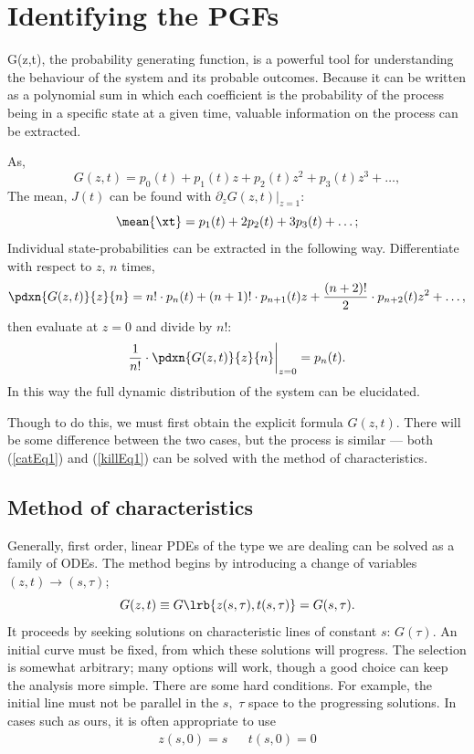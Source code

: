 \section{Identifying the PGFs}

G(z,t), the probability generating function, is a powerful tool for understanding the behaviour of the system and its probable outcomes. Because it can be written as a polynomial sum in which each coefficient is the probability of the process being in a specific state at a given time, valuable information on the process can be extracted. \par
As,
$$G(z,t) = p_0(t) + p_1(t)z + p_2(t)z^2 + p_3(t)z^3 + \dots,$$
The mean, $J(t)$ can be found with $\partial_zG(z,t)|_{z=1}$:
$$\mean{\xt} = p_1(t) + 2p_2(t) + 3p_3(t) + \dots;$$
Individual state-probabilities can be extracted in the following way. Differentiate with respect to $z$, $n$ times,
$$\pdxn{G(z,t)}{z}{n} =  n! \cdot p_n(t) + (n+1)! \cdot p_{n+1}(t) z + \frac{(n+2)!}{2} \cdot p_{n+2}(t) z^2 + \dots,$$
then evaluate at $z=0$ and divide by $n!$:
\begin{equation}
\label{stateFormula}
\frac{1}{n!}\cdot\pdxn{G(z,t)}{z}{n}\bigg|_{z=0} = p_n(t).
\end{equation}
In this way the full dynamic distribution of the system can be elucidated.

Though to do this, we must first obtain the explicit formula $G(z,t)$. There will be some difference between the two cases, but the process is similar --- both (\ref{catEq1}) and (\ref{killEq1}) can be solved with the method of characteristics. 


\subsection{Method of characteristics}

Generally, first order, linear PDEs of the type we are dealing can be solved as a family of ODEs. The method begins by introducing a change of variables $(z,t)\to(s,\tau)$;
$$G(z,t)\equiv G\lrb{z(s, \tau),t(s,\tau)} = G(s, \tau).$$
It proceeds by seeking solutions on characteristic lines of constant $s$: $G(\tau)$. An initial curve must be fixed, from which these solutions will progress. The selection is somewhat arbitrary; many options will work, though a good choice can keep the analysis more simple. There are some hard conditions. For example, the initial line must not be parallel in the $s,$ $\tau$ space to the progressing solutions. In cases such as ours, it is often appropriate to use
\begin{align}
\label{ICs}
z(s,0) = s&& t(s,0) = 0
\end{align}

